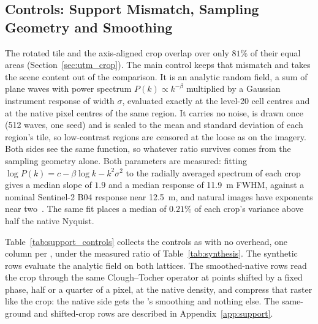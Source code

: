 \subsection{Controls: Support Mismatch, Sampling Geometry and Smoothing}
\label{sec:support_controls}

The rotated tile and the axis-aligned crop overlap over only $81\%$ of
their equal areas (Section~\ref{sec:utm_crop}). The main control keeps
that mismatch and takes the scene content out of the comparison. It is an
analytic random field, a sum of plane waves with power spectrum
$P(k)\propto k^{-\beta}$ multiplied by a Gaussian instrument response of
width $\sigma$, evaluated exactly at the level-20 cell centres and at the
native pixel centres of the same region. It carries no noise, is drawn
once (512 waves, one seed) and is scaled to the mean and standard
deviation of each region's tile, so low-contrast regions are censored at
the loose  as on the imagery. Both sides see the same
function, so whatever ratio survives comes from the sampling geometry
alone. Both parameters are measured: fitting
$\log P(k)=c-\beta\log k-k^2\sigma^2$ to the radially averaged spectrum of
each crop gives a median slope of $1.9$ and a median response of
\SI{11.9}{m} FWHM, against a nominal Sentinel-2 B04 response near
\SI{12.5}{m}, and natural images have exponents near
two~\cite{tolhurst1992amplitude,vanderschaaf1996powerspectra}. The same
fit places a median of $0.21\%$ of each crop's variance above half the
native Nyquist.

Table~\ref{tab:support_controls} collects the controls as 
with no overhead, one column per , under the measured ratio
of Table~\ref{tab:synthesis}. The synthetic rows evaluate the analytic
field on both lattices. The smoothed-native rows read the crop through
the same Clough--Tocher operator at points shifted by a fixed phase,
half or a quarter of a pixel, at the native density, and compress that
raster like the crop: the native side gets the 's
smoothing and nothing else. The same-ground and
shifted-crop rows are described in Appendix~\ref{app:support}.



